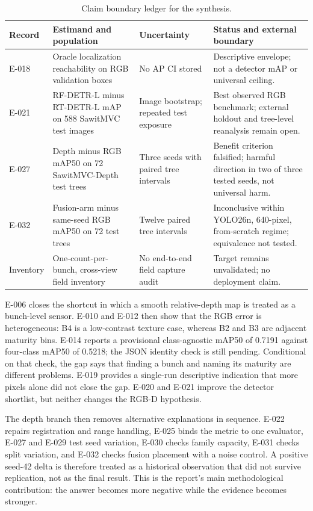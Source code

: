 \documentclass[preprint,12pt]{elsarticle}
\begin{document}
\begin{table}[H]
\centering\small
\caption{Claim boundary ledger for the synthesis.}
\label{tab:claim-boundary}
\begin{tabularx}{\columnwidth}{L{0.17\columnwidth}L{0.22\columnwidth}L{0.16\columnwidth}Y}
\toprule
\textbf{Record} & \textbf{Estimand and population} & \textbf{Uncertainty} & \textbf{Status and external boundary}\\
\midrule
E-018 & Oracle localization reachability on RGB validation boxes & No AP CI stored & Descriptive envelope; not a detector mAP or universal ceiling.\\
E-021 & RF-DETR-L minus RT-DETR-L mAP on 588 SawitMVC test images & Image bootstrap; repeated test exposure & Best observed RGB benchmark; external holdout and tree-level reanalysis remain open.\\
E-027 & Depth minus RGB mAP50 on 72 SawitMVC-Depth test trees & Three seeds with paired tree intervals & Benefit criterion falsified; harmful direction in two of three tested seeds, not universal harm.\\
E-032 & Fusion-arm minus same-seed RGB mAP50 on 72 test trees & Twelve paired tree intervals & Inconclusive within YOLO26n, 640-pixel, from-scratch regime; equivalence not tested.\\
Inventory & One-count-per-bunch, cross-view field inventory & No end-to-end field capture audit & Target remains unvalidated; no deployment claim.\\
\bottomrule
\end{tabularx}
\end{table}

E-006 closes the shortcut in which a smooth
relative-depth map is treated as a bunch-level sensor. E-010 and E-012 then
show that the RGB error is heterogeneous: B4 is a low-contrast texture case,
whereas B2 and B3 are adjacent maturity bins. E-014 reports a provisional
class-agnostic mAP50 of 0.7191 against four-class mAP50 of 0.5218; the JSON
identity check is still pending. Conditional on that check, the gap says that
finding a bunch and naming its maturity are different problems. E-019 provides
a single-run descriptive indication that more pixels alone did not close the
gap. E-020
and E-021 improve the detector shortlist, but neither changes the RGB-D
hypothesis.

The depth branch then removes alternative explanations in sequence. E-022
repairs registration and range handling, E-025 binds the metric to one
evaluator, E-027 and E-029 test seed variation, E-030 checks family capacity,
E-031 checks split variation, and E-032 checks fusion placement with a noise
control. A positive seed-42 delta is therefore treated as a historical
observation that did not survive replication, not as the final result. This
is the report's main methodological contribution: the answer becomes more
negative while the evidence becomes stronger.
\end{document}
